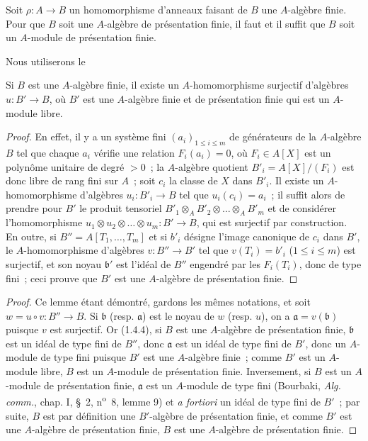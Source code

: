 \begin{proposition}[1.4.7]
\label{IV.1.4.7-fr}
Soit $\rho:A\to B$ un homomorphisme d'anneaux faisant de $B$ une $A$-algèbre
finie. Pour que $B$ soit une $A$-algèbre de présentation finie, il faut et il
suffit que $B$ soit un $A$-module de présentation finie.
\end{proposition}

Nous utiliserons le

\begin{lemma}[1.4.7.1]
\label{IV.1.4.7.1-fr}
Si $B$ est une $A$-algèbre finie, il existe un $A$-homomorphisme surjectif
d'algèbres $u:B'\to B$, où $B'$ est une $A$-algèbre finie et de présentation
finie qui est un $A$-module libre.
\end{lemma}

\begin{proof}
En effet, il y a un système fini $(a_i)_{1\leq i\leq m}$ de générateurs de la
$A$-algèbre $B$ tel que chaque $a_i$ vérifie une relation $F_i(a_i)=0$, où
$F_i\in A[X]$ est un polynôme unitaire de degré $>0$~; la $A$-algèbre quotient
$B'_i=A[X]/(F_i)$ est donc libre de rang fini sur $A$~; soit $c_i$ la classe de
$X$ dans $B'_i$. Il existe un $A$-homomorphisme d'algèbres $u_i:B'_i\to B$
tel que $u_i(c_i)=a_i$~; il suffit alors de prendre pour $B'$ le produit
tensoriel $B'_1\otimes_AB'_2\otimes\ldots\otimes_AB'_m$ et de considérer
l'homomorphisme $u_1\otimes u_2\otimes\ldots\otimes u_m:B'\to B$, qui est
surjectif par construction. En outre, si $B''=A[T_1,\ldots,T_m]$ et si $b'_i$
désigne l'image canonique de $c_i$ dans $B'$, le $A$-homomorphisme d'algèbres
$v:B''\to B'$ tel que $v(T_i)=b'_i$ ($1\leq i\leq m$) est surjectif, et son
noyau $\mathfrak b'$ est l'idéal de $B''$ engendré par les $F_i(T_i)$, donc de
type fini~; ceci prouve que $B'$ est une $A$-algèbre de présentation finie.
\end{proof}

\begin{proof}
Ce lemme étant démontré, gardons les mêmes notations, et soit
$w=u\circ v:B''\to B$. Si $\mathfrak b$ (resp. $\mathfrak a$) est le noyau de
$w$ (resp. $u$), on a $\mathfrak a=v(\mathfrak b)$ puisque $v$ est surjectif.
Or (1.4.4), si $B$ est une $A$-algèbre de présentation finie, $\mathfrak b$
est un idéal de type fini de $B''$, donc $\mathfrak a$ est un idéal de type
fini de $B'$, donc un $A$-module de type fini puisque $B'$ est une $A$-algèbre
finie~; comme $B'$ est un $A$-module libre, $B$ est un $A$-module de
présentation finie. Inversement, si $B$ est un $A$-module de présentation
finie, $\mathfrak a$ est un $A$-module de type fini (Bourbaki,
\emph{Alg. comm.}, chap. I, \S~2, n\textsuperscript{o}~8, lemme 9) et
\emph{a fortiori} un idéal de type fini de $B'$~; par suite, $B$ est par
définition une $B'$-algèbre de présentation finie, et comme $B'$ est une
$A$-algèbre de présentation finie, $B$ est une $A$-algèbre de présentation
finie.
\end{proof}

